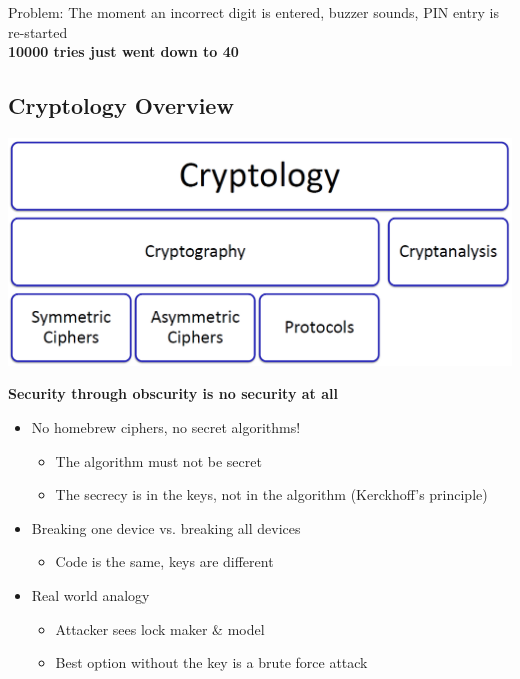 Problem: The moment an incorrect digit is entered, buzzer sounds, PIN entry is re-started\\
\textbf{10000 tries just went down to 40}

\subsection{Cryptology Overview}
\includegraphics[width=0.5\linewidth]{images/EmbeddedSecurity/cryptologyOverview}

\textbf{Security through obscurity is no security at all}
\begin{itemize}
  \item No homebrew ciphers, no secret algorithms!
        \begin{itemize}
          \item The algorithm must not be secret
          \item The secrecy is in the keys, not in the algorithm (Kerckhoff's principle)
        \end{itemize}
  \item Breaking one device vs. breaking all devices
        \begin{itemize}
          \item Code is the same, keys are different
        \end{itemize}
  \item Real world analogy
        \begin{itemize}
          \item Attacker sees lock maker \& model
          \item Best option without the key is a brute force attack
        \end{itemize}
\end{itemize}

